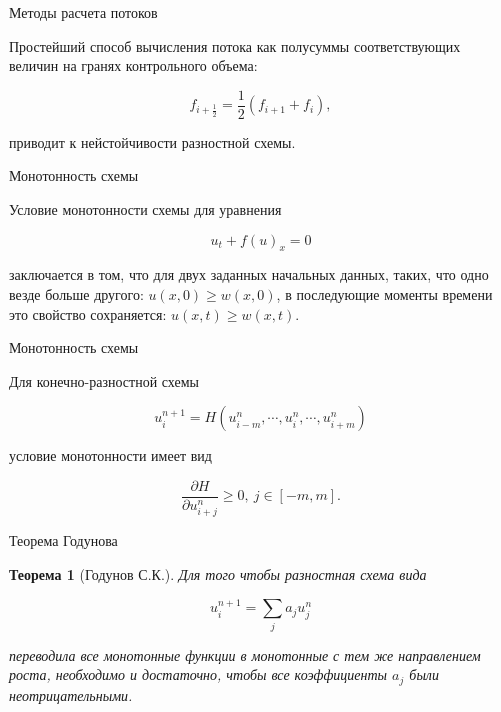 \documentclass[10pt,xcolor=pst,aspectratio=169]{beamer}
\begin{document}
\begin{frame}{Методы расчета потоков}

	\transdissolve[duration=0.1]
	\justifying
	\large

	Простейший способ вычисления потока как полусуммы соответствующих величин на гранях контрольного объема:

	\[
		f_{i + \frac{1}{2}} = \frac{1}{2} \left( f_{i + 1} + f_{i} \right),
	\]

	приводит к нейстойчивости разностной схемы.

\end{frame}

\begin{frame}{Монотонность схемы}

	\transdissolve[duration=0.1]
	\justifying
	\large

	Условие монотонности схемы для уравнения

	\[
		u_{t} + f(u)_{x} = 0
	\]
	
	заключается в том, что для двух заданных начальных данных, таких, что одно везде больше другого: $u(x, 0) \geq w(x, 0)$, в последующие моменты времени это свойство сохраняется: $u(x, t) \geq w(x, t)$.

\end{frame}

\begin{frame}{Монотонность схемы}

	\transdissolve[duration=0.1]
	\justifying
	\large

	Для конечно-разностной схемы

	\[
		u_{i}^{n + 1} = H \left( u_{i - m}^{n}, \cdots, u_{i}^{n}, \cdots, u_{i + m}^{n} \right)
	\]

	условие монотонности имеет вид

	\[
		\frac{\partial H}{\partial u_{i + j}^{n}} \geq 0, \: j \in [-m, m].
	\]

\end{frame}

\begin{frame}{Теорема Годунова}

	\transdissolve[duration=0.1]
	\justifying
	\large

	\newtheorem{Th}{Теорема}
	\begin{Th}[Годунов С.К.]
		\justifying
		Для того чтобы разностная схема вида

		\[
			u_{i}^{n + 1} = \sum_{j} a_{j} u_{j}^{n}
		\]
		
		переводила все монотонные функции в монотонные с тем же направлением роста, необходимо и достаточно, чтобы все коэффициенты $a_{j}$ были неотрицательными.
	\end{Th}

\end{frame}
\end{document}
